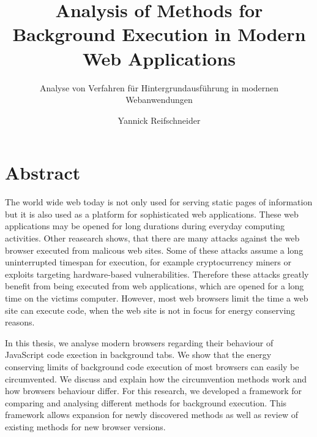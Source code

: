 \documentclass[
	ngerman,
	ruledheaders=section,%
	class=report,%
	thesis={type=bachelor},%
	accentcolor=9c,%
	custommargins=true,%
	marginpar=false,%
	parskip=half-,%
	fontsize=11pt,%
]{tudapub}
\begin{document}

\title{Analysis of Methods for Background Execution in Modern Web Applications}
\subtitle{Analyse von Verfahren für Hintergrundausführung in modernen Webanwendungen}
\author[Y. Reifschneider]{Yannick Reifschneider}%


\submissiondate{\today}
\examdate{\today}


\maketitle

\affidavit


  \newpage
  \chapter*{Abstract}

  The world wide web today is not only used for serving static pages of information but it is also used as a platform for sophisticated web applications. These web applications may be opened for long durations during everyday computing activities. Other reasearch shows, that there are many attacks against the web browser executed from malicous web sites. Some of these attacks assume a long uninterrupted timespan for execution, for example cryptocurrency miners or exploits targeting hardware-based vulnerabilities. Therefore these attacks greatly benefit from being executed from web applications, which are opened for a long time on the victims computer. However, most web browsers limit the time a web site can execute code, when the web site is not in focus for energy conserving reasons.

  In this thesis, we analyse modern browsers regarding their behaviour of JavaScript code exection in background tabs. We show that the energy conserving limits of background code execution of most browsers can easily be circumvented. We discuss and explain how the circumvention methods work and how browsers behaviour differ. For this research, we developed a framework for comparing and analysing different methods for background execution. This framework allows expansion for newly discovered methods as well as review of existing methods for new browser versions.
\end{document}
